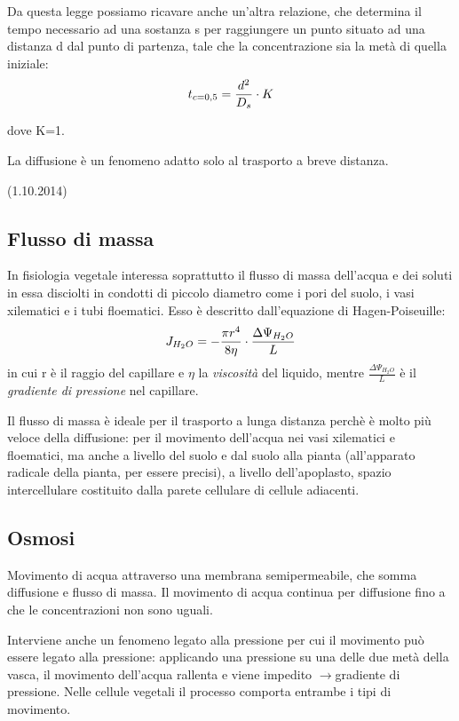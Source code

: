 \documentclass[a4paper,12pt]{book}
\newcommand{\lfreccia}{\ensuremath{\longrightarrow}}
\begin{document}
Da questa legge possiamo ricavare anche un'altra relazione, che determina il tempo necessario ad una sostanza s per raggiungere un punto situato ad una distanza d dal punto di partenza, tale che la concentrazione sia la metà di quella iniziale:
\begin{equation}
t_{c=0,5}=\frac{d^2}{D_{s}} \cdot K
\centering
\end{equation}

dove K=1.

La diffusione è un fenomeno adatto solo al trasporto a breve distanza.  

(1.10.2014)
\subsection{Flusso di massa}
In fisiologia vegetale interessa soprattutto il flusso di massa dell’acqua e dei soluti in essa
disciolti in condotti di piccolo diametro come i pori del suolo, i vasi xilematici e i tubi floematici.
Esso è descritto dall’equazione di Hagen-Poiseuille:
\begin{equation}
\centering
J_{H_{2}O}= - \frac{\pi r^{4}}{8 \eta} \cdot \frac{\Delta \Psi_{H_{2}O}}{L}
\end{equation}
in cui r è il raggio del capillare e $\eta$ la \emph{viscosità} del liquido, mentre $\frac{\Delta \Psi_{H_{2}O}}{L}$ è il \emph{gradiente di pressione} nel capillare.

Il flusso di massa è ideale per il trasporto a lunga distanza perchè è molto più veloce della diffusione: per il movimento dell'acqua nei vasi xilematici e floematici, ma anche a livello del suolo e dal suolo alla pianta (all'apparato radicale della pianta, per essere precisi), a livello dell'apoplasto, spazio intercellulare costituito dalla parete cellulare di cellule adiacenti. 

\subsection{Osmosi}
Movimento di acqua attraverso una membrana semipermeabile, che somma diffusione e flusso di massa. Il movimento di acqua continua per diffusione fino a che le concentrazioni non sono uguali.

Interviene anche un fenomeno legato alla pressione per cui il movimento può essere legato alla pressione: applicando una pressione su una delle due metà della vasca, il movimento dell'acqua rallenta e viene impedito \lfreccia gradiente di pressione.
Nelle cellule vegetali il processo comporta entrambe i tipi di movimento.
\end{document}
